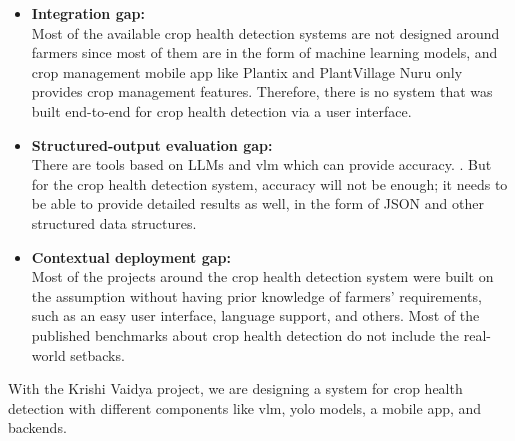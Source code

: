 \begin{itemize}
    \item \textbf{Integration gap:} \\
    Most of the available crop health detection systems are not designed around farmers since most of them are in the form of machine learning models, and crop management mobile app like Plantix and PlantVillage Nuru only provides crop management features. \parencite{petrellaPlantix2023,mrishoPlantVillageNuru2020,mohanty2016plantvillage} Therefore, there is no system that was built end-to-end for crop health detection via a user interface. 
    
    \item \textbf{Structured-output evaluation gap:} \\
    There are tools based on LLMs and vlm which can provide accuracy. \parencite{wangAgriLLaVA2024,yangLLMCropDisease2024}. But for the crop health detection system, accuracy will not be enough; it needs to be able to provide detailed results as well, in the form of JSON and other structured data structures. 
    
    \item \textbf{Contextual deployment gap:} \\
    Most of the projects around the crop health detection system were built on the assumption without having prior knowledge of farmers' requirements, such as an easy user interface, language support, and others. Most of the published benchmarks about crop health detection do not include the real-world setbacks. \parencite{thakurPlantDiseaseFieldGap2022}
\end{itemize}

With the Krishi Vaidya project, we are designing a system for crop health detection with different components like vlm, yolo models, a mobile app, and backends. 

